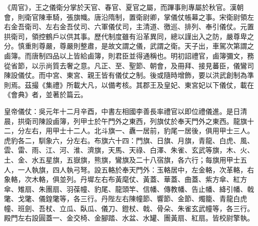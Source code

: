 
\begin{pinyinscope}
《周官》，王之儀衛分掌於天官、春官、夏官之屬，而蹕事則專屬於秋官。漢朝會，則衛官陳車騎，張旗幟。唐沿隋制，置衛尉卿，掌儀仗帳幕之事。宋衛尉領左右金吾衛司、左右金吾仗司、六軍儀仗司，主清道、徼巡、排列、奉引儀仗。元置拱衛司，領控鶴戶以供其事。歷代制度雖有沿革異同，總以謹出入之防，嚴尊卑之分。慎重則尊嚴，尊嚴則整肅，是故文謂之儀，武謂之衛。天子出，車駕次第謂之鹵簿。而唐制四品以上皆給鹵簿，則君臣並得通稱也。明初詔禮官，鹵簿彌文，務從省節，以示尚質去奢之意。凡正、至、聖節、朝會，及冊拜、接見蕃臣，儀鸞司陳設儀仗。而中宮、東宮、親王皆有儀仗之制。後或隨時增飾，要以洪武創制為準則焉。茲撮《集禮》所載大凡，以備考核。其郡王及皇妃、東宮妃以下儀仗，載在《會典》者，並著於篇云。

皇帝儀仗：吳元年十二月辛酉，中書左相國李善長率禮官以即位禮儀進。是日清晨，拱衛司陳設鹵簿，列甲士於午門外之東西，列旗仗於奉天門外之東西。龍旗十二，分左右，用甲士十二人。北斗旗一、纛一居前，豹尾一居後，俱用甲士三人。虎豹各二，馴象六，分左右。布旗六十四：門旗、日旗、月旗，青龍、白虎、風、雲、雷、雨、江、河、淮、濟旗，天馬、天祿、白澤、朱雀、玄武等旗，木、火、土、金、水五星旗，五嶽旗，熊旗，鸞旗及二十八宿旗，各六行；每旗用甲士五人，一人執旗，四人執弓弩。設五輅於奉天門外：玉輅居中，左金輅，次革輅，右象輅，次木輅，俱並列。丹墀左右布黃麾仗、黃蓋、華蓋、曲蓋、紫方傘、紅方傘、雉扇、朱團扇、羽葆幢、豹尾、龍頭竿、信幡、傳教幡、告止幡、絳引幡、戟氅、戈氅、儀鍠氅等，各三行。丹陛左右陳幢節、響節、金節、燭籠、青龍白虎幢、班劍、吾杖、立瓜、臥瓜、儀刀、鐙杖、戟、骨朵、朱雀玄武幢等，各三行。殿門左右設圓蓋一、金交椅、金腳踏、水盆、水罐、團黃扇、紅扇。皆校尉擎執。


\end{pinyinscope}
